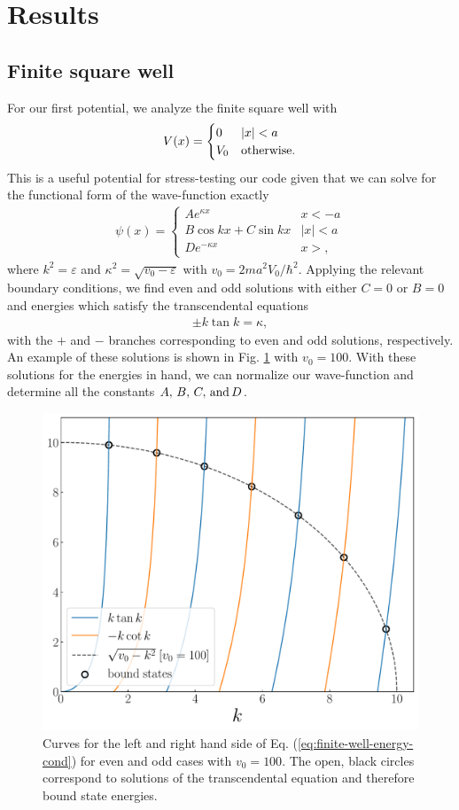 \section{Results}
\label{sec:results}

\subsection{Finite square well}
\label{ssec:finite-square-well}

For our first potential, we analyze the finite square well with
\begin{align}
    V(x) = \begin{cases}
        0 & |x| < a \\
        V_0 & {\rm otherwise}
    .\end{cases}
\end{align}
This is a useful potential for stress-testing our code given that we can solve for the functional form of the wave-function exactly
\begin{align}
    \psi(x) = \begin{cases}
        A e^{\kappa x} & x < -a \\
        B \cos{k x} + C \sin{kx} & |x| < a \\
        D e^{-\kappa x} & x > 
    ,\end{cases}
\end{align}
where $k^2 = \varepsilon$ and $\kappa^2 = \sqrt{v_0 - \varepsilon}$ with $v_0 = 2 m a^2 V_0 / \hbar^2$.
Applying the relevant boundary conditions, we find even and odd solutions with either $C = 0$ or $B = 0$ and energies which satisfy the transcendental equations
\begin{align}
\label{eq:finite-well-energy-cond}
    \pm k \tan{k} = \kappa
,\end{align}
with the $+$ and $-$ branches corresponding to even and odd solutions, respectively.
An example of these solutions is shown in Fig. \ref{fig:finite-well-exact-solutions} with $v_0 = 100$.
With these solutions for the energies in hand, we can normalize our wave-function and determine all the constants $A,\,B,\,C,\,{\rm and}\,D$.

\begin{figure}[h!tb]
    \centering
    \includegraphics[width=0.5\linewidth]{finite_well_exact_solutions.pdf}
    \caption{Curves for the left and right hand side of Eq. (\ref{eq:finite-well-energy-cond}) for even and odd cases with $v_0 = 100$. The open, black circles correspond to solutions of the transcendental equation and therefore bound state energies.}
    \label{fig:finite-well-exact-solutions}
\end{figure}

